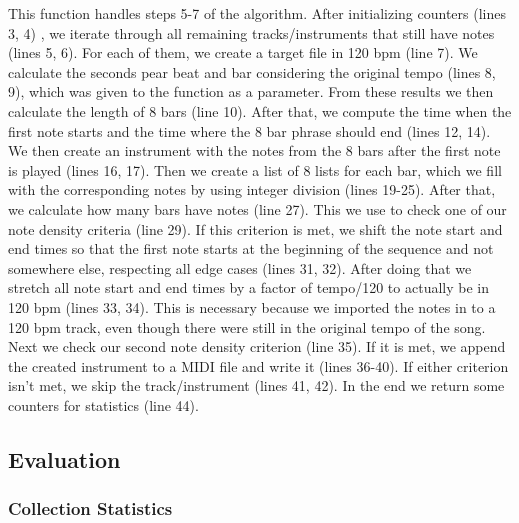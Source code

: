 \documentclass[a4paper,12pt]{extarticle}
\begin{document}
This function handles steps 5-7 of the algorithm.
After initializing counters (lines 3, 4) , we iterate through all remaining tracks/instruments that still have notes (lines 5, 6). For each of them, we create a target file in 120 bpm (line 7). We calculate the seconds pear beat and bar considering the original tempo (lines 8, 9), which was given to the function as a parameter. From these results we then calculate the length of 8 bars (line 10). After that, we compute the time when the first note starts and the time where the 8 bar phrase should end (lines 12, 14). We then create an instrument with the notes from the 8 bars after the first note is played (lines 16, 17). Then we create a list of 8 lists for each bar, which we fill with the corresponding notes by using integer division (lines 19-25). After that, we calculate how many bars have notes (line 27). This we use to check one of our note density criteria (line 29). If this criterion is met, we shift the note start and end times so that the first note starts at the beginning of the sequence and not somewhere else, respecting all edge cases (lines 31, 32). 
After doing that we stretch all note start and end times by a factor of tempo/120 to actually be in 120 bpm (lines 33, 34). This is necessary because we imported the notes in to a 120 bpm track, even though there were still in the original tempo of the song. Next we check our second note density criterion (line 35). If it is met, we append the created instrument to a MIDI file and write it (lines 36-40). If either criterion isn't met, we skip the track/instrument (lines 41, 42). In the end we return some counters for statistics (line 44).


\subsection{Evaluation}
\subsubsection{Collection Statistics}
\end{document}
